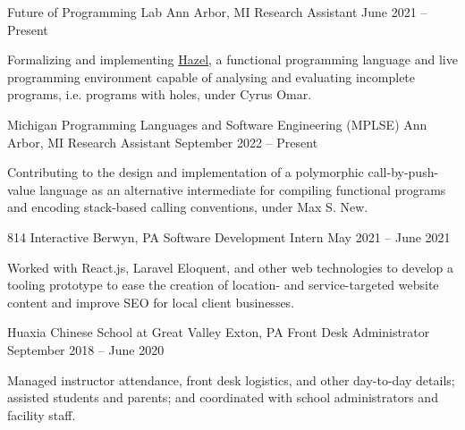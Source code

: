 \documentclass[letterpaper,11pt]{article}
\begin{document}
  \begin{rsectionlist}
    \rsectionitem
      {Future of Programming Lab}
      {Ann Arbor, MI}
      {Research Assistant}
      {June 2021 -- Present}
      
      Formalizing and implementing \href{https://hazel.org}{Hazel}, a functional programming
      language and live programming environment capable of analysing and evaluating incomplete
      programs, i.e. programs with holes, under Cyrus Omar.

      \begin{rpointlist}
      \end{rpointlist}

    \rsectionitem
      {Michigan Programming Languages and Software Engineering (MPLSE)}
      {Ann Arbor, MI}
      {Research Assistant}
      {September 2022 -- Present}

      Contributing to the design and implementation of a polymorphic call-by-push-value language as
      an alternative intermediate for compiling functional programs and encoding stack-based calling
      conventions, under Max S. New.

    \rsectionitem
      {814 Interactive}
      {Berwyn, PA}
      {Software Development Intern}
      {May 2021 -- June 2021}

      Worked with React.js, Laravel Eloquent, and other web technologies to develop a tooling
      prototype to ease the creation of location- and service-targeted website content and improve
      SEO for local client businesses.

    \rsectionitem
      {Huaxia Chinese School at Great Valley}
      {Exton, PA}
      {Front Desk Administrator}
      {September 2018 -- June 2020}

      Managed instructor attendance, front desk logistics, and other day-to-day details; assisted
      students and parents; and coordinated with school administrators and facility staff.


\end{rsectionlist}
\end{document}
